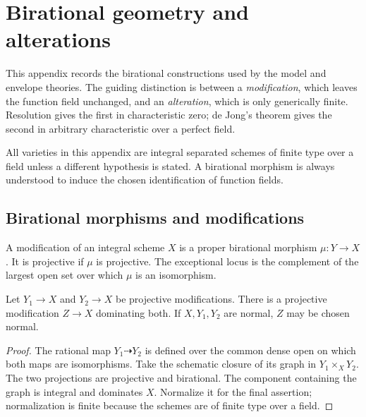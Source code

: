 \chapter{Birational geometry and alterations}
\label{app:birational-geometry}

This appendix records the birational constructions used by the model and
envelope theories.  The guiding distinction is between a
\emph{modification}, which leaves the function field unchanged, and an
\emph{alteration}, which is only generically finite.  Resolution gives the
first in characteristic zero; de Jong's theorem gives the second in
arbitrary characteristic over a perfect field.

All varieties in this appendix are integral separated schemes of finite
type over a field unless a different hypothesis is stated.  A birational
morphism is always understood to induce the chosen identification of
function fields.

\section{Birational morphisms and modifications}
\label{sec:appB-modifications}

\begin{definition}[Modification]
\label{def:appB-modification}
A modification of an integral scheme \(X\) is a proper birational morphism
\(\mu:Y\to X\).  It is projective if \(\mu\) is projective.  The exceptional
locus is the complement of the largest open set over which \(\mu\) is an
isomorphism.
\end{definition}

\begin{lemma}\label{lem:appB-common-domination}
Let \(Y_1\to X\) and \(Y_2\to X\) be projective modifications.  There is a
projective modification \(Z\to X\) dominating both.  If \(X,Y_1,Y_2\) are
normal, \(Z\) may be chosen normal.
\end{lemma}

\begin{proof}
The rational map \(Y_1\dashrightarrow Y_2\) is defined over the common
dense open on which both maps are isomorphisms.  Take the schematic closure
of its graph in \(Y_1\times_XY_2\).  The two projections are projective and
birational.  The component containing the graph is integral and dominates
\(X\).  Normalize it for the final assertion; normalization is finite
because the schemes are of finite type over a field.
\end{proof}

